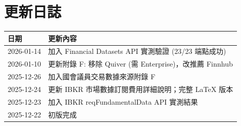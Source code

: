 \documentclass[11pt,a4paper]{article}
\begin{document}
\section*{更新日誌}

\begin{table}[H]
\centering
\begin{tabular}{@{}ll@{}}
\toprule
\textbf{日期} & \textbf{更新內容} \\
\midrule
2026-01-14 & 加入 Financial Datasets API 實測驗證 (23/23 端點成功) \\
2026-01-10 & 更新附錄 F: 移除 Quiver (需 Enterprise)，改推薦 Finnhub \\
2025-12-26 & 加入國會議員交易數據來源附錄 F \\
2025-12-24 & 更新 IBKR 市場數據訂閱費用詳細說明；完整 LaTeX 版本 \\
2025-12-23 & 加入 IBKR reqFundamentalData API 實測結果 \\
2025-12-22 & 初版完成 \\
\bottomrule
\end{tabular}
\end{table}
\end{document}
